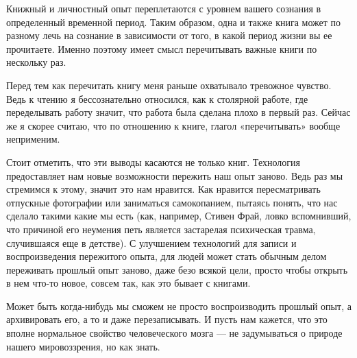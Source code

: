 \documentclass[ebook,12pt,oneside,openany]{memoir}
\begin{document}
Книжный и личностный опыт переплетаются с уровнем вашего сознания в
определенный временной период. Таким образом, одна и также книга может
по разному лечь на сознание в зависимости от того, в какой период
жизни вы ее прочитаете. Именно поэтому имеет смысл перечитывать важные
книги по нескольку раз.

Перед тем как перечитать книгу меня раньше охватывало тревожное
чувство. Ведь к чтению я бессознательно относился, как к столярной
работе, где переделывать работу значит, что работа была сделана плохо
в первый раз. Сейчас же я скорее считаю, что по отношению к книге,
глагол «перечитывать» вообще неприменим.

Стоит отметить, что эти выводы касаются не только книг. Технология
предоставляет нам новые возможности пережить наш опыт заново. Ведь раз
мы стремимся к этому, значит это нам нравится. Как нравится
пересматривать отпускные фотографии или заниматься самокопанием,
пытаясь понять, что нас сделало такими какие мы есть (как, например,
Стивен Фрай, ловко вспомнивший, что причиной его неумения петь
является застарелая психическая травма, случившаяся еще в детстве). С
улучшением технологий для записи и воспроизведения пережитого опыта,
для людей может стать обычным делом переживать прошлый опыт заново,
даже безо всякой цели, просто чтобы открыть в нем что-то новое, совсем
так, как это бывает с книгами.

Может быть когда-нибудь мы сможем не просто воспроизводить прошлый
опыт, а архивировать его, а то и даже перезаписывать. И пусть нам
кажется, что это вполне нормальное свойство человеческого мозга — не
задумываться о природе нашего мировоззрения, но как знать.
\end{document}
